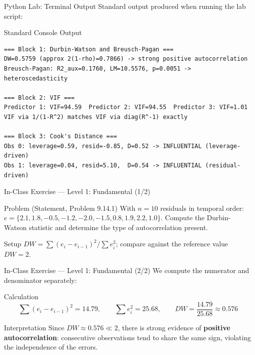 \documentclass[10pt, aspectratio=169]{beamer}
\begin{document}
\begin{frame}[fragile]{Python Lab: Terminal Output}
  \scriptsize
  Standard output produced when running the lab script:
  \vspace{0.02cm}
  \begin{block}{Standard Console Output}
    \fontsize{3.6pt}{4.3pt}\selectfont
    \begin{verbatim}
=== Block 1: Durbin-Watson and Breusch-Pagan ===
DW=0.5759 (approx 2(1-rho)=0.7866) -> strong positive autocorrelation
Breusch-Pagan: R2_aux=0.1760, LM=10.5576, p=0.0051 -> heteroscedasticity

=== Block 2: VIF ===
Predictor 1: VIF=94.59  Predictor 2: VIF=94.55  Predictor 3: VIF=1.01
VIF via 1/(1-R^2) matches VIF via diag(R^-1) exactly

=== Block 3: Cook's Distance ===
Obs 0: leverage=0.59, resid=-0.85, D=0.52 -> INFLUENTIAL (leverage-driven)
Obs 1: leverage=0.04, resid=5.10,  D=0.54 -> INFLUENTIAL (residual-driven)
    \end{verbatim}
  \end{block}
\end{frame}

\begin{frame}{In-Class Exercise --- Level 1: Fundamental (1/2)}
  \footnotesize
  \begin{block}{Problem (Statement, Problem 9.14.1)}
    With $n=10$ residuals in temporal order: $e=\{2.1,1.8,-0.5,-1.2,-2.0,-1.5,0.8,1.9,2.2,1.0\}$. Compute the Durbin-Watson statistic and determine the type of autocorrelation present.
  \end{block}

  \vspace{0.15cm}
  \pause
  \begin{alertblock}{Setup}
    $DW=\sum(e_i-e_{i-1})^2/\sum e_i^2$; compare against the reference value $DW=2$.
  \end{alertblock}
\end{frame}

\begin{frame}{In-Class Exercise --- Level 1: Fundamental (2/2)}
  \scriptsize
  We compute the numerator and denominator separately: \pause

  \vspace{0.05cm}
  \begin{block}{Calculation}
    $$\sum(e_i-e_{i-1})^2=14.79, \qquad \sum e_i^2=25.68, \qquad DW=\frac{14.79}{25.68}\approx0.576$$
  \end{block}

  \vspace{0.05cm}
  \pause
  \begin{alertblock}{Interpretation}
    Since $DW\approx0.576\ll2$, there is strong evidence of \textbf{positive autocorrelation}: consecutive observations tend to share the same sign, violating the independence of the errors.
  \end{alertblock}
\end{frame}
\end{document}
